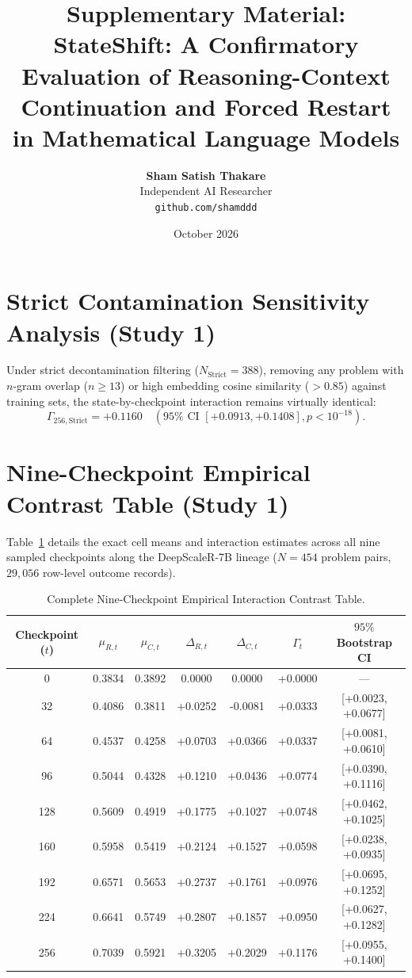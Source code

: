 \documentclass[11pt]{article}
\title{\textbf{Supplementary Material: StateShift: A Confirmatory Evaluation of Reasoning-Context Continuation and Forced Restart in Mathematical Language Models}}
\author{
  \textbf{Sham Satish Thakare} \\
  Independent AI Researcher \\
  \texttt{github.com/shamddd} \\
}
\date{October 2026}
\begin{document}
\maketitle

\section{Strict Contamination Sensitivity Analysis (Study 1)}
Under strict decontamination filtering ($N_{\text{Strict}} = 388$), removing any problem with $n$-gram overlap ($n \ge 13$) or high embedding cosine similarity ($> 0.85$) against training sets, the state-by-checkpoint interaction remains virtually identical:
\begin{equation}
\Gamma_{256,\text{Strict}} = +0.1160 \quad (95\% \text{ CI } [+0.0913, +0.1408], p < 10^{-18}).
\end{equation}

\section{Nine-Checkpoint Empirical Contrast Table (Study 1)}
Table~\ref{tab:supp_trajectory} details the exact cell means and interaction estimates across all nine sampled checkpoints along the DeepScaleR-7B lineage ($N=454$ problem pairs, $29,056$ row-level outcome records).

\begin{table}[h]
\centering
\caption{Complete Nine-Checkpoint Empirical Interaction Contrast Table.}
\label{tab:supp_trajectory}
\begin{tabular}{ccccccc}
\toprule
Checkpoint ($t$) & $\mu_{R,t}$ & $\mu_{C,t}$ & $\Delta_{R,t}$ & $\Delta_{C,t}$ & $\Gamma_t$ & $95\%$ Bootstrap CI \\
\midrule
0   & 0.3834 & 0.3892 & 0.0000 & 0.0000 & +0.0000 & --- \\
32  & 0.4086 & 0.3811 & +0.0252 & -0.0081 & +0.0333 & [+0.0023, +0.0677] \\
64  & 0.4537 & 0.4258 & +0.0703 & +0.0366 & +0.0337 & [+0.0081, +0.0610] \\
96  & 0.5044 & 0.4328 & +0.1210 & +0.0436 & +0.0774 & [+0.0390, +0.1116] \\
128 & 0.5609 & 0.4919 & +0.1775 & +0.1027 & +0.0748 & [+0.0462, +0.1025] \\
160 & 0.5958 & 0.5419 & +0.2124 & +0.1527 & +0.0598 & [+0.0238, +0.0935] \\
192 & 0.6571 & 0.5653 & +0.2737 & +0.1761 & +0.0976 & [+0.0695, +0.1252] \\
224 & 0.6641 & 0.5749 & +0.2807 & +0.1857 & +0.0950 & [+0.0627, +0.1282] \\
256 & 0.7039 & 0.5921 & +0.3205 & +0.2029 & +0.1176 & [+0.0955, +0.1400] \\
\bottomrule
\end{tabular}
\end{table}
\end{document}
